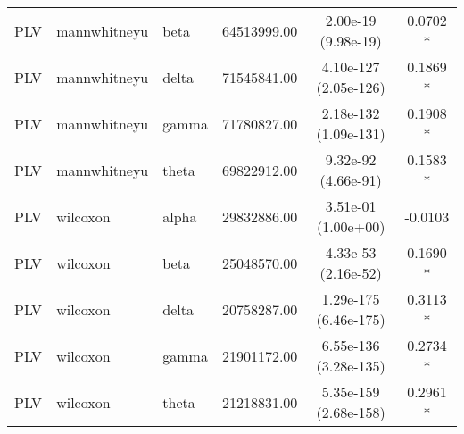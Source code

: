 \begin{tabular}{l l l c c c}
    PLV & mannwhitneyu & beta & 64513999.00 & 2.00e-19 (9.98e-19) & 0.0702 * \\
    PLV & mannwhitneyu & delta & 71545841.00 & 4.10e-127 (2.05e-126) & 0.1869 * \\
    PLV & mannwhitneyu & gamma & 71780827.00 & 2.18e-132 (1.09e-131) & 0.1908 * \\
    PLV & mannwhitneyu & theta & 69822912.00 & 9.32e-92 (4.66e-91) & 0.1583 * \\
    PLV & wilcoxon & alpha & 29832886.00 & 3.51e-01 (1.00e+00) & -0.0103  \\
    PLV & wilcoxon & beta & 25048570.00 & 4.33e-53 (2.16e-52) & 0.1690 * \\
    PLV & wilcoxon & delta & 20758287.00 & 1.29e-175 (6.46e-175) & 0.3113 * \\
    PLV & wilcoxon & gamma & 21901172.00 & 6.55e-136 (3.28e-135) & 0.2734 * \\
    PLV & wilcoxon & theta & 21218831.00 & 5.35e-159 (2.68e-158) & 0.2961 * \\
    \bottomrule
\end{tabular}